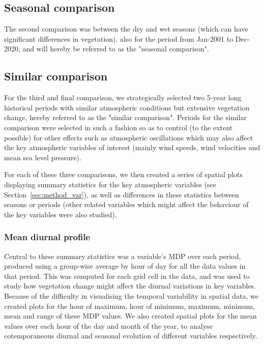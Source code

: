 \subsection{Seasonal comparison}

The second comparison was between the dry and wet seasons (which can have significant differences in vegetation). also for the period from Jan-2001 to Dec-2020, and will hereby be referred to as the "seasonal comparison".

\subsection{Similar comparison}

For the third and final comparison, we strategically selected two 5-year long historical periods with similar atmospheric conditions but extensive vegetation change, hereby referred to as the "similar comparison". Periods for the similar comparison were selected in such a fashion so as to control (to the extent possible) for other effects such as atmospheric oscillations which may also affect the key atmospheric variables of interest (mainly wind speeds, wind velocities and mean sea level pressure).

For each of these three comparisons, we then created a series of spatial plots displaying summary statistics for the key atmospheric variables (see Section~\ref{sec:method_var}), as well as differences in these statistics between seasons or periods (other related variables which might affect the behaviour of the key variables were also studied).

\subsubsection{Mean diurnal profile}

Central to these summary statistics was a variable's \ac{MDP} over each period, produced using a group-wise average by hour of day for all the data values in that period. This was computed for each grid cell in the data, and was used to study how vegetation change might affect the diurnal variations in key variables. Because of the difficulty in visualising the temporal variability in spatial data, we created plots for the hour of maximum, hour of minimum, maximum, minimum, mean and range of these \ac{MDP} values. We also created spatial plots for the mean values over each hour of the day and month of the year, to analyse cotemporaneous diurnal and seasonal evolution of different variables respectively.

